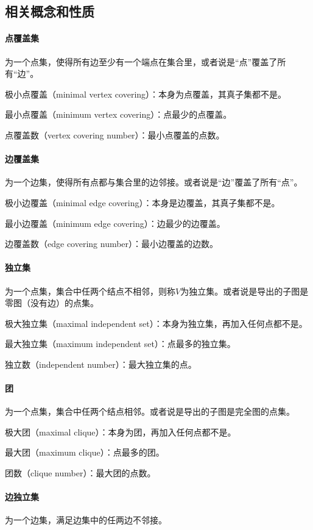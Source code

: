 \subsection{相关概念和性质}

\paragraph{点覆盖集} 为一个点集，使得所有边至少有一个端点在集合里，或者说是“点”覆盖了所有“边”。

极小点覆盖（minimal vertex covering）：本身为点覆盖，其真子集都不是。

最小点覆盖（minimum vertex covering）：点最少的点覆盖。

点覆盖数（vertex covering number）：最小点覆盖的点数。

\paragraph{边覆盖集} 为一个边集，使得所有点都与集合里的边邻接。或者说是“边”覆盖了所有“点”。

极小边覆盖（minimal edge covering）：本身是边覆盖，其真子集都不是。

最小边覆盖（minimum edge covering）：边最少的边覆盖。

边覆盖数（edge covering number）：最小边覆盖的边数。

\paragraph{独立集} 为一个点集，集合中任两个结点不相邻，则称$V$为独立集。或者说是导出的子图是零图（没有边）的点集。

极大独立集（maximal independent set）：本身为独立集，再加入任何点都不是。

最大独立集（maximum independent set）：点最多的独立集。

独立数（independent number）：最大独立集的点。

\paragraph{团} 为一个点集，集合中任两个结点相邻。或者说是导出的子图是完全图的点集。

极大团（maximal clique）：本身为团，再加入任何点都不是。

最大团（maximum clique）：点最多的团。

团数（clique number）：最大团的点数。

\paragraph{边独立集} 为一个边集，满足边集中的任两边不邻接。

